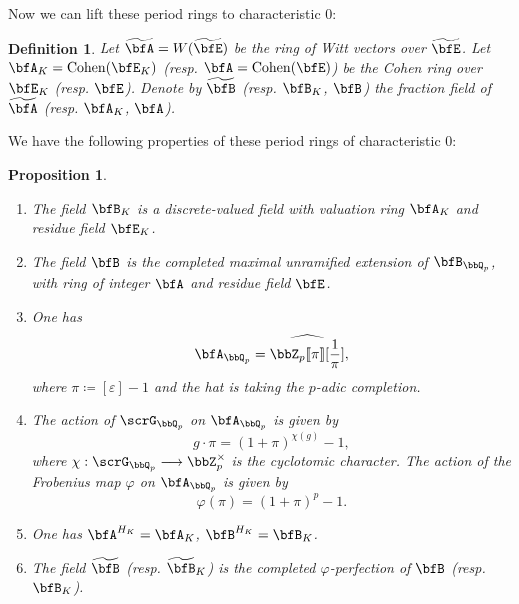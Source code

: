 \documentclass[a4paper,oneside]{amsart}
\newtheorem{proposition}[theorem]{Proposition}
\newtheorem{definition}[theorem]{Definition}
\numberwithin{equation}{section}
\numberwithin{figure}{section}
\begin{document}
Now we can lift these period rings to characteristic $0$:
\begin{definition}
	Let $\widetilde{\bfA}=W(\widetilde{\bfE})$ be the ring of Witt vectors over $\widetilde{\bfE}$. Let $\bfA_K=\opn{Cohen}(\bfE_K)$ (resp. $\bfA=\opn{Cohen}(\bfE)$) be the Cohen ring over $\bfE_K$ (resp. $\bfE$). Denote by $\widetilde{\bfB}$ (resp. $\bfB_K$, $\bfB$) the fraction field of $\widetilde{\bfA}$ (resp. $\bfA_K$, $\bfA$).
\end{definition}

We have the following properties of these period rings of characteristic $0$:
\begin{proposition}\leavevmode
	\begin{enumerate}
		\item The field $\bfB_K$ is a discrete-valued field with valuation ring $\bfA_K$ and residue field $\bfE_K$.
		\item The field $\bfB$ is the completed maximal unramified extension of $\bfB_{\bbQ_p}$, with ring of integer $\bfA$ and residue field $\bfE$.
		\item One has
		      $$\bfA_{\bbQ_p}=\widehat{\bbZ_p\llbracket\pi\rrbracket[\frac{1}{\pi}]},$$
		      where $\pi\coloneqq [\varepsilon]-1$ and the hat is taking the $p$-adic completion.
		\item The action of $\scrG_{\bbQ_p}$ on $\bfA_{\bbQ_p}$ is given by
		      $$g\cdot\pi=(1+\pi)^{\chi(g)}-1,$$ where $\chi:\scrG_{\bbQ_p}\lto \bbZ_p^\times$ is the cyclotomic character. The action of the Frobenius map $\varphi$ on $\bfA_{\bbQ_p}$ is given by
		      $$\varphi(\pi)=(1+\pi)^p-1.$$
		\item One has $\bfA^{H_K}=\bfA_K$, $\bfB^{H_K}=\bfB_K$.
		\item The field $\widetilde{\bfB}$ (resp. $\widetilde{\bfB}_K$) is the completed $\varphi$-perfection of $\bfB$ (resp. $\bfB_K$).
	\end{enumerate}
\end{proposition}
\end{document}
